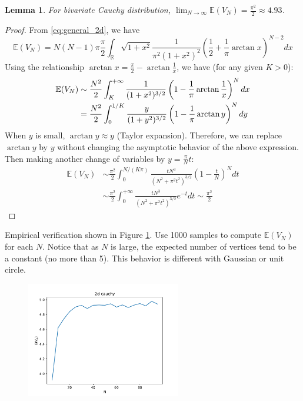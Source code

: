 \documentclass{article}
\newtheorem{lemma}{Lemma}
\def\E{\mathbb{E}}
\def\R{\mathbb{R}}
\begin{document}
\begin{lemma}\label{lem:lim_V_N_2d_cauchy}
    For bivariate Cauchy distribution,
$\lim_{N\to \infty}\E(V_N) = \frac{\pi^2}{2} \approx 4.93$.
\end{lemma}
\begin{proof}
From \eqref{eq:general_2d},
we have
\begin{equation}\label{eq:d_2_cauchy_E_V_n}
\E(V_N) = N(N-1)\pi \frac{\pi}{2}\int_{\R}
\sqrt{1+x^2}\frac{1}{\pi^2 (1+x^2)^2}(\frac{1}{2}
+\frac{1}{\pi}\arctan x)^{N-2}dx
\end{equation}
Using the relationship $\arctan x =
\frac{\pi}{2} - \arctan \frac{1}{x}
$, we have (for any given $K>0$):
\begin{align}
    \E(V_N) &\sim \frac{N^2}{2}\int_{K}^{+\infty}
    \frac{1}{(1+x^2)^{3/2}}
    \left(1-\frac{1}{\pi}\arctan \frac{1}{x} \right)^{N}dx\notag \\
    &=\frac{N^2}{2}\int_{0}^{1/K}
    \frac{y}{(1+y^2)^{3/2}}
    \left(1-\frac{1}{\pi}\arctan y\right)^{N}dy
    \label{eq:cauchy_inverse_K_y}\\
\end{align}
When $y$ is small, $\arctan y \approx y$ (Taylor expansion).
Therefore, we can replace $\arctan y$ by $y$ without changing the
asymptotic behavior of the above expression.
Then making another change of variables by
$y=\frac{\pi}{N}t$:
\begin{align*}
    \E(V_N) &\sim \frac{\pi^2}{2}\int_{0}^{N/(K\pi)}
    \frac{tN^3}{(N^2+\pi^2 t^2)^{3/2}}
    \left(1-\frac{t}{N}\right)^{N}dt\\
    &\sim \frac{\pi^2}{2}\int_{0}^{+\infty}
    \frac{tN^3}{(N^2+\pi^2 t^2)^{3/2}}
    e^{-t}dt \sim  \frac{\pi^2}{2}
\end{align*}
\end{proof}
Empirical verification shown in Figure \ref{fig:2d_cauchy}. Use 1000 samples to compute $\E(V_N)$
for each $N$. Notice that as $N$ is large, the expected
number of vertices tend to be a constant (no more than 5).
This behavior is different with Gaussian or unit circle.

\begin{figure}[!ht]
    \centering
    \includegraphics[width=0.6\textwidth]{2d_cauchy_vertices.pdf}
    \caption{}\label{fig:2d_cauchy}
\end{figure}
\end{document}
